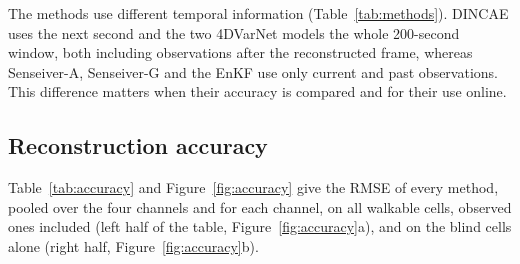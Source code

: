 \documentclass[english, 12pt, a4paper, elec, utf8, a-2b, online]{aaltothesis}
\begin{document}
The methods use different temporal information (Table~\ref{tab:methods}).
DINCAE uses the next second and the two 4DVarNet models the whole 200-second
window, both including observations after the reconstructed frame, whereas
Senseiver\nobreakdash-A, Senseiver\nobreakdash-G and the EnKF use only current and past observations.
This difference matters when their accuracy is compared and for their use
online.

\subsection{Reconstruction accuracy}
\label{sec:res_acc}

Table~\ref{tab:accuracy} and Figure~\ref{fig:accuracy} give the RMSE of every
method, pooled over the four channels and for each channel, on all walkable
cells, observed ones included (left half of the table, Figure~\ref{fig:accuracy}a),
and on the blind cells alone (right half, Figure~\ref{fig:accuracy}b).

\begin{table}[htb]
	\centering
	\caption{Reconstruction RMSE on the 15 test days, pooled over the four
	channels (``All'') and per channel, on all walkable cells, observed and
	blind (left), and on the blind cells (right). Physical units apply to the
	per-channel columns; pooled values have no single physical unit. Lower is
	better; the lowest value of each column is in bold.}
	\label{tab:accuracy}
	\small
	\setlength{\tabcolsep}{4pt}
\end{table}
\end{document}

